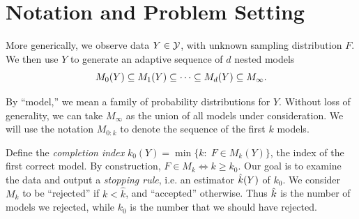 \documentclass{article}
\begin{document}


\section{Notation and Problem Setting}
\label{sec:genericSetting}

More generically, we observe data $Y \in \mathcal{Y}$, with unknown sampling distribution $F$. We then use $Y$ to generate an adaptive sequence of $d$ nested models
\[
M_0(Y) \subseteq M_1(Y) \subseteq \cdots \subseteq M_d(Y) \subseteq M_\infty.
\]

By ``model,'' we mean a family of probability distributions for $Y$. Without loss of generality, we can take $M_\infty$ as the union of all models under consideration. We will use the notation $M_{0:k}$ to denote the sequence of the first $k$ models.

Define the {\em completion index} $k_0(Y) = \min\{k:\; F \in M_k(Y)\}$, the index of the first correct model. By construction, $F\in M_k \iff k \geq k_0$. Our goal is to examine the data and output a {\em stopping rule}, i.e. an estimator $\hat{k}(Y)$ of $k_0$. We consider $M_k$ to be ``rejected'' if $k < \hat k$, and ``accepted'' otherwise. Thus $\hat{k}$ is the number of models we rejected, while $k_0$ is the number that we should have rejected. 
\end{document}
